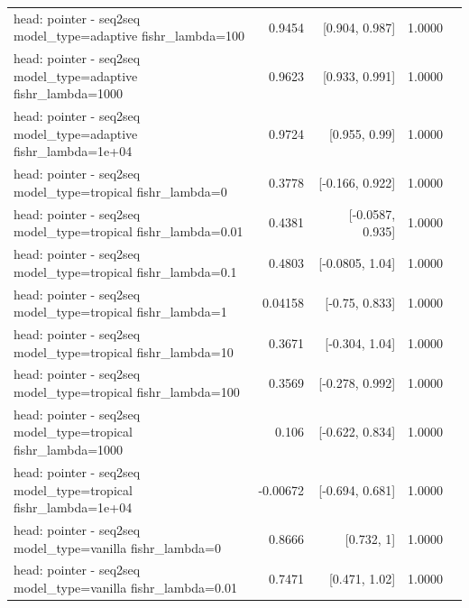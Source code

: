 \documentclass[10pt]{article}
\makeatletter
\newcommand{\stackcell}[1]{\begin{tabular}[t]{@{}l@{}}#1\end{tabular}}
\makeatother
\begin{document}
{\begin{longtable}{lrrrl}
\stackcell{head: pointer - seq2seq\\\footnotesize model\_type=adaptive fishr\_lambda=100 } & 0.9454 & [0.904, 0.987] & 1.0000 & \\
\stackcell{head: pointer - seq2seq\\\footnotesize model\_type=adaptive fishr\_lambda=1000 } & 0.9623 & [0.933, 0.991] & 1.0000 & \\
\stackcell{head: pointer - seq2seq\\\footnotesize model\_type=adaptive fishr\_lambda=1e+04 } & 0.9724 & [0.955, 0.99] & 1.0000 & \\
\stackcell{head: pointer - seq2seq\\\footnotesize model\_type=tropical fishr\_lambda=0 } & 0.3778 & [-0.166, 0.922] & 1.0000 & \\
\stackcell{head: pointer - seq2seq\\\footnotesize model\_type=tropical fishr\_lambda=0.01 } & 0.4381 & [-0.0587, 0.935] & 1.0000 & \\
\stackcell{head: pointer - seq2seq\\\footnotesize model\_type=tropical fishr\_lambda=0.1 } & 0.4803 & [-0.0805, 1.04] & 1.0000 & \\
\stackcell{head: pointer - seq2seq\\\footnotesize model\_type=tropical fishr\_lambda=1 } & 0.04158 & [-0.75, 0.833] & 1.0000 & \\
\stackcell{head: pointer - seq2seq\\\footnotesize model\_type=tropical fishr\_lambda=10 } & 0.3671 & [-0.304, 1.04] & 1.0000 & \\
\stackcell{head: pointer - seq2seq\\\footnotesize model\_type=tropical fishr\_lambda=100 } & 0.3569 & [-0.278, 0.992] & 1.0000 & \\
\stackcell{head: pointer - seq2seq\\\footnotesize model\_type=tropical fishr\_lambda=1000 } & 0.106 & [-0.622, 0.834] & 1.0000 & \\
\stackcell{head: pointer - seq2seq\\\footnotesize model\_type=tropical fishr\_lambda=1e+04 } & -0.00672 & [-0.694, 0.681] & 1.0000 & \\
\stackcell{head: pointer - seq2seq\\\footnotesize model\_type=vanilla fishr\_lambda=0 } & 0.8666 & [0.732, 1] & 1.0000 & \\
\stackcell{head: pointer - seq2seq\\\footnotesize model\_type=vanilla fishr\_lambda=0.01 } & 0.7471 & [0.471, 1.02] & 1.0000 & \\

\end{longtable}}
\end{document}
